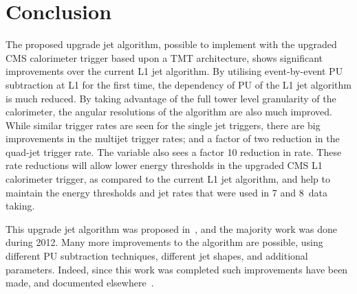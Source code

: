 \section{Conclusion}
The proposed upgrade jet algorithm, possible to implement with the upgraded \ac{CMS} calorimeter trigger based upon a \ac{TMT} architecture, shows significant improvements over the current \ac{L1} jet algorithm.
By utilising event-by-event \ac{PU} subtraction at \ac{L1} for the first time, the dependency of \ac{PU} of the \ac{L1} jet algorithm is much reduced.
By taking advantage of the full tower level granularity of the calorimeter, the angular resolutions of the algorithm are also much improved.
While similar trigger rates are seen for the single jet triggers, there are big improvements in the multijet trigger rates; and a factor of two reduction in the quad-jet trigger rate.
The \HT variable also sees a factor 10 reduction in rate.
These rate reductions will allow lower energy thresholds in the upgraded \ac{CMS} \ac{L1} calorimeter trigger, as compared to the current \ac{L1} jet algorithm, and help to maintain the energy thresholds and jet rates that were used in 7 and 8~\TeV data taking.


This upgrade jet algorithm was proposed in~\cite{Tapper:1556311}, and the majority work was done during 2012. 
Many more improvements to the algorithm are possible, using different \ac{PU} subtraction techniques, different jet shapes, and additional parameters.
Indeed, since this work was completed such improvements have been made, and documented elsewhere~\cite{newL1jetWork}.

